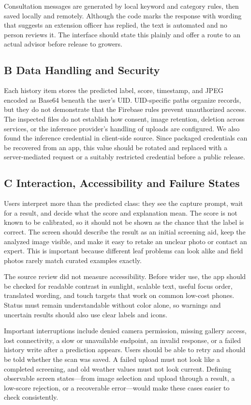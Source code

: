 \documentclass[conference]{IEEEtran}
\begin{document}
Consultation messages are generated by local keyword and category rules, then saved locally and remotely. Although the code marks the response with wording that suggests an extension officer has replied, the text is automated and no person reviews it. The interface should state this plainly and offer a route to an actual advisor before release to growers.

\subsection*{B Data Handling and Security}

Each history item stores the predicted label, score, timestamp, and JPEG encoded as Base64 beneath the user's UID. UID-specific paths organize records, but they do not demonstrate that the Firebase rules prevent unauthorized access. The inspected files do not establish how consent, image retention, deletion across services, or the inference provider's handling of uploads are configured. We also found the inference credential in client-side source. Since packaged credentials can be recovered from an app, this value should be rotated and replaced with a server-mediated request or a suitably restricted credential before a public release.

\subsection*{C Interaction, Accessibility and Failure States}

Users interpret more than the predicted class: they see the capture prompt, wait for a result, and decide what the score and explanation mean. The score is not known to be calibrated, so it should not be shown as the chance that the label is correct. The screen should describe the result as an initial screening aid, keep the analyzed image visible, and make it easy to retake an unclear photo or contact an expert. This is important because different leaf problems can look alike and field photos rarely match curated examples exactly.

The source review did not measure accessibility. Before wider use, the app should be checked for readable contrast in sunlight, scalable text, useful focus order, translated wording, and touch targets that work on common low-cost phones. Status must remain understandable without color alone, so warnings and uncertain results should also use clear labels and icons.

Important interruptions include denied camera permission, missing gallery access, lost connectivity, a slow or unavailable endpoint, an invalid response, or a failed history write after a prediction appears. Users should be able to retry and should be told whether the scan was saved. A failed upload must not look like a completed screening, and old weather values must not look current. Defining observable screen states—from image selection and upload through a result, a low-score rejection, or a recoverable error—would make these cases easier to check consistently.
\end{document}
